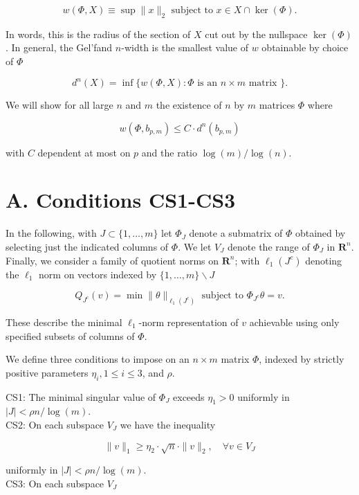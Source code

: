 \documentclass[10pt]{article}
\begin{document}
\begin{equation*}
w(\Phi, X) \equiv \sup \|x\|_{2} \text { subject to } x \in X \cap \operatorname{ker}(\Phi) . \tag{II.1}
\end{equation*}


In words, this is the radius of the section of $X$ cut out by the nullspace $\operatorname{ker}(\Phi)$. In general, the Gel'fand $n$-width is the smallest value of $w$ obtainable by choice of $\Phi$

$$
d^{n}(X)=\inf \{w(\Phi, X): \Phi \text { is an } n \times m \text { matrix }\} .
$$

We will show for all large $n$ and $m$ the existence of $n$ by $m$ matrices $\Phi$ where

$$
w\left(\Phi, b_{p, m}\right) \leq C \cdot d^{n}\left(b_{p, m}\right)
$$

with $C$ dependent at most on $p$ and the ratio $\log (m) / \log (n)$.

\section*{A. Conditions CS1-CS3}
In the following, with $J \subset\{1, \ldots, m\}$ let $\Phi_{J}$ denote a submatrix of $\Phi$ obtained by selecting just the indicated columns of $\Phi$. We let $V_{J}$ denote the range of $\Phi_{J}$ in $\boldsymbol{R}^{n}$. Finally, we consider a family of quotient norms on $\boldsymbol{R}^{n}$; with $\ell_{1}\left(J^{c}\right)$ denoting the $\ell_{1}$ norm on vectors indexed by $\{1, \ldots, m\} \backslash J$

$$
Q_{J^{c}}(v)=\min \|\theta\|_{\ell_{1}\left(J^{c}\right)} \text { subject to } \Phi_{J^{c}} \theta=v .
$$

These describe the minimal $\ell_{1}$-norm representation of $v$ achievable using only specified subsets of columns of $\Phi$.

We define three conditions to impose on an $n \times m$ matrix $\Phi$, indexed by strictly positive parameters $\eta_{i}, 1 \leq i \leq 3$, and $\rho$.

CS1: The minimal singular value of $\Phi_{J}$ exceeds $\eta_{1}>0$ uniformly in $|J|<\rho n / \log (m)$.\\
CS2: On each subspace $V_{J}$ we have the inequality

$$
\|v\|_{1} \geq \eta_{2} \cdot \sqrt{n} \cdot\|v\|_{2}, \quad \forall v \in V_{J}
$$

uniformly in $|J|<\rho n / \log (m)$.\\
CS3: On each subspace $V_{J}$
\end{document}
